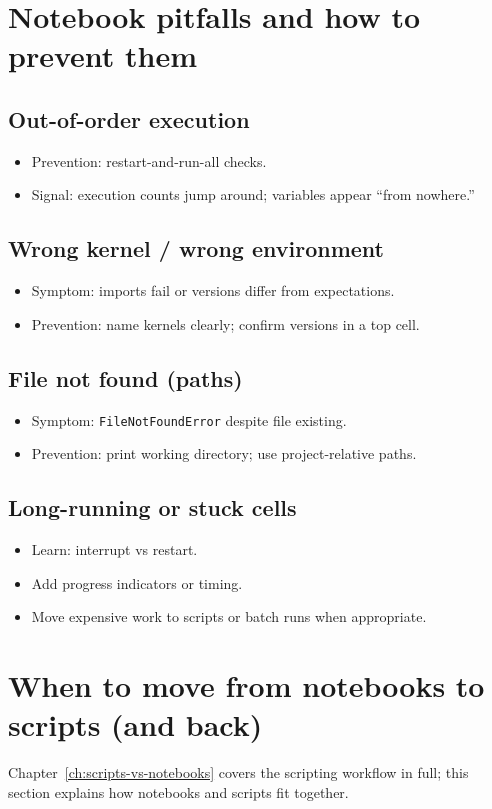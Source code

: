 \section{Notebook pitfalls and how to prevent them}
\subsection{Out-of-order execution}
\begin{itemize}
\item Prevention: restart-and-run-all checks.
\item Signal: execution counts jump around; variables appear ``from nowhere.''
\end{itemize}

\subsection{Wrong kernel / wrong environment}
\begin{itemize}
\item Symptom: imports fail or versions differ from expectations.
\item Prevention: name kernels clearly; confirm versions in a top cell.
\end{itemize}

\subsection{File not found (paths)}
\begin{itemize}
\item Symptom: \texttt{FileNotFoundError} despite file existing.
\item Prevention: print working directory; use project-relative paths.
\end{itemize}

\subsection{Long-running or stuck cells}
\begin{itemize}
\item Learn: interrupt vs restart.
\item Add progress indicators or timing.
\item Move expensive work to scripts or batch runs when appropriate.
\end{itemize}

\section{When to move from notebooks to scripts (and back)}
Chapter~\ref{ch:scripts-vs-notebooks} covers the scripting workflow in full; this section explains how notebooks and scripts fit together.
